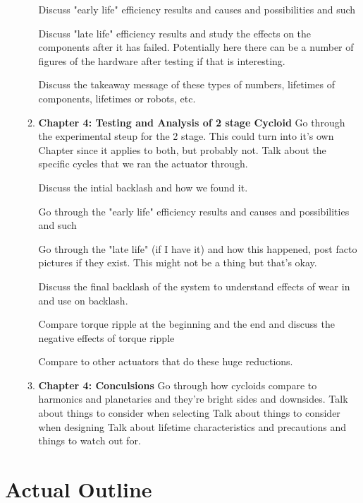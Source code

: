 \begin{enumerate}
\begin{enumerate}
		Discuss "early life" efficiency results and causes and possibilities and such 

		Discuss "late life" efficiency results and study the effects on the components after it has failed.
		Potentially here there can be a number of figures of the hardware after testing if that is interesting. 

		Discuss the takeaway message of these types of numbers, lifetimes of components, lifetimes or robots, etc. 

		\item \textbf{Chapter 4: Testing and Analysis of 2 stage Cycloid}
		Go through the experimental steup for the 2 stage. This could turn into it's own Chapter since it applies to both, but probably not. 
		Talk about the specific cycles that we ran the actuator through. 

		Discuss the intial backlash and how we found it.

		Go through the "early life" efficiency results and causes and possibilities and such 

		Go through the "late life" (if I have it) and how this happened, post facto pictures if they exist. This might not be a thing but that's okay. 

		Discuss the final backlash of the system to understand effects of wear in and use on backlash. 

		Compare torque ripple at the beginning and the end and discuss the negative effects of torque ripple 

		Compare to other actuators that do these huge reductions. 

		\item \textbf{Chapter 4: Conculsions}
		Go through how cycloids compare to harmonics and planetaries and they're bright sides and downsides. 
		Talk about things to consider when selecting
		Talk about things to consider when designing
		Talk about lifetime characteristics and precautions and things to watch out for. 

	\end{enumerate}
\end{enumerate}

\section{Actual Outline}

